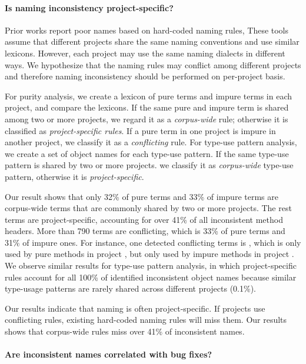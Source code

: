 \paragraph{Is naming inconsistency project-specific?} Prior works report poor names based on hard-coded naming rules, These tools assume that different projects share the same naming conventions and use similar lexicons. However, each project may use the same naming dialects in different ways. We hypothesize that the naming rules may conflict among different projects and therefore naming inconsistency should be performed on per-project basis. 

For purity analysis, we create a lexicon of pure terms and impure terms in each project, and compare the lexicons. If the same pure and impure term is shared among two or more projects, we regard it as a {\it corpus-wide} rule; otherwise it is classified as {\it project-specific rules}. If a pure term in one project is impure in another project, we classify it as a {\it conflicting} rule. For type-use pattern analysis, we create a set of object names for each type-use pattern. If the same type-use pattern is shared by two or more projects. we classify it as {\it corpus-wide} type-use pattern, otherwise it is {\it project-specific}.

Our result shows that only 32\% of pure terms and 33\% of impure terms are corpus-wide terms that are commonly shared by two or more projects. The rest terms are project-specific, accounting for over 41\% of all inconsistent method headers. More than 790 terms are conflicting, which is 33\% of pure terms and 31\% of impure ones. For instance, one detected conflicting terms is , which is only used by pure methods in project , but only used by impure methods in project . We observe similar results for type-use pattern analysis, in which project-specific rules account for all 100\% of identified inconsistent object names because similar type-usage patterns are rarely shared across different projects (0.1\%). 

Our results indicate that naming is often project-specific. If projects use conflicting rules, existing hard-coded naming rules will miss them. Our results shows that corpus-wide rules miss over 41\% of inconsistent names. 

\paragraph{Are inconsistent names correlated with bug fixes?}  

